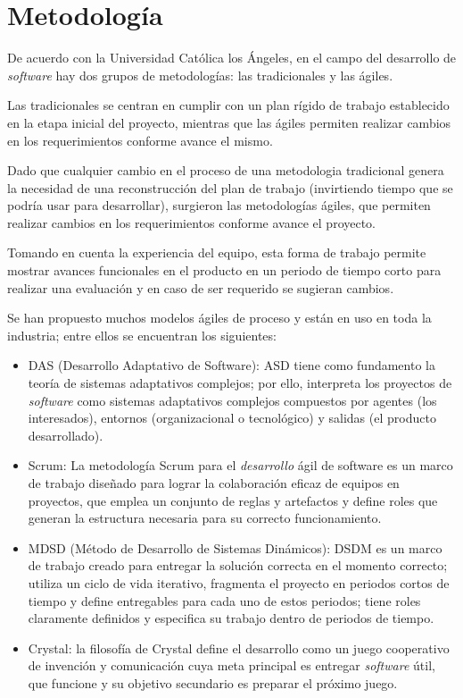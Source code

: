 
\section{Metodología}
De acuerdo con la Universidad Católica los Ángeles\cite{universidad_catolica_los_angeles_metodologidesarrollo_2020}, en el campo del desarrollo de \textit{software} hay dos grupos de metodologías: las tradicionales y las ágiles.


Las tradicionales se centran en cumplir con un plan rígido de trabajo establecido en la etapa inicial del proyecto, mientras que las ágiles permiten realizar cambios en los requerimientos conforme avance el mismo.


Dado que cualquier cambio en el proceso de una metodologia tradicional genera la necesidad de una reconstrucción del plan de trabajo (invirtiendo tiempo que se podría usar para desarrollar), surgieron las metodologías ágiles, que permiten realizar cambios en los requerimientos conforme avance el proyecto. 


Tomando en cuenta la experiencia del equipo, esta forma de trabajo permite mostrar avances funcionales en el producto en un periodo de tiempo corto para realizar una evaluación y en caso de ser requerido se sugieran cambios.


Se han propuesto muchos modelos ágiles de proceso y están en uso en toda la industria; entre ellos se encuentran los siguientes:


\begin{itemize}
	\item DAS (Desarrollo Adaptativo de Software): ASD tiene como fundamento la teoría de sistemas adaptativos complejos; por ello, interpreta los proyectos de \textit{software} como sistemas adaptativos complejos compuestos
    por agentes (los interesados), entornos (organizacional o tecnológico) y salidas (el producto desarrollado)\cite{cadavid_revision_2013}.
	\item Scrum: La metodología Scrum para el \textit{desarrollo} ágil de software es un marco de trabajo diseñado para lograr la colaboración eficaz de equipos en proyectos, que emplea un conjunto de reglas y artefactos y define roles que generan la estructura necesaria para su correcto funcionamiento\cite{cadavid_revision_2013}.
	\item MDSD (Método de Desarrollo de Sistemas Dinámicos): DSDM es un marco de trabajo creado para entregar la solución correcta en el momento correcto; utiliza un ciclo de vida iterativo, fragmenta el proyecto en periodos cortos de tiempo y define entregables para cada uno de estos periodos; tiene roles claramente definidos y especifica su trabajo dentro de periodos de tiempo\cite{cadavid_revision_2013}.
	\item Crystal: la filosofía de Crystal define el desarrollo como un juego cooperativo de invención y comunicación cuya meta principal es entregar \textit{software} útil, que funcione y su objetivo secundario es preparar el próximo juego\cite{cadavid_revision_2013}.
\end{itemize}


